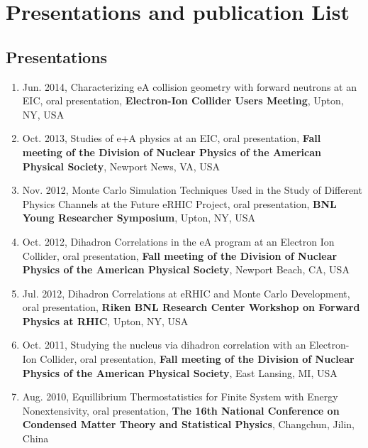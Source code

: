\chapter*{Presentations and publication List}

\section*{Presentations}

\begin{enumerate}
  
\item Jun. 2014, Characterizing eA collision geometry with forward neutrons at an EIC, oral presentation,
  \textbf{Electron-Ion Collider Users Meeting}, Upton, NY, USA
  
\item Oct. 2013, Studies of e+A physics at an EIC, oral presentation,
  \textbf{Fall meeting of the Division of Nuclear Physics of the American Physical Society}, Newport News, VA, USA
  
\item Nov. 2012, Monte Carlo Simulation Techniques Used in the Study of Different Physics Channels at the Future eRHIC Project, oral presentation,
  \textbf{BNL Young Researcher Symposium}, Upton, NY, USA  
  
\item Oct. 2012, Dihadron Correlations in the eA program at an Electron Ion Collider, oral presentation,
  \textbf{Fall meeting of the Division of Nuclear Physics of the American Physical Society}, Newport Beach, CA, USA

\item Jul. 2012, Dihadron Correlations at eRHIC and Monte Carlo Development, oral presentation,
  \textbf{Riken BNL Research Center Workshop on Forward Physics at RHIC}, Upton, NY, USA

\item Oct. 2011, Studying the nucleus via dihadron correlation with an Electron-Ion Collider, oral presentation,
  \textbf{Fall meeting of the Division of Nuclear Physics of the American Physical Society}, East Lansing, MI, USA

\item Aug. 2010, Equillibrium Thermostatistics for Finite System with Energy Nonextensivity, oral presentation,
  \textbf{The 16th National Conference on Condensed Matter Theory and Statistical Physics}, Changchun, Jilin, China
  

\end{enumerate}
